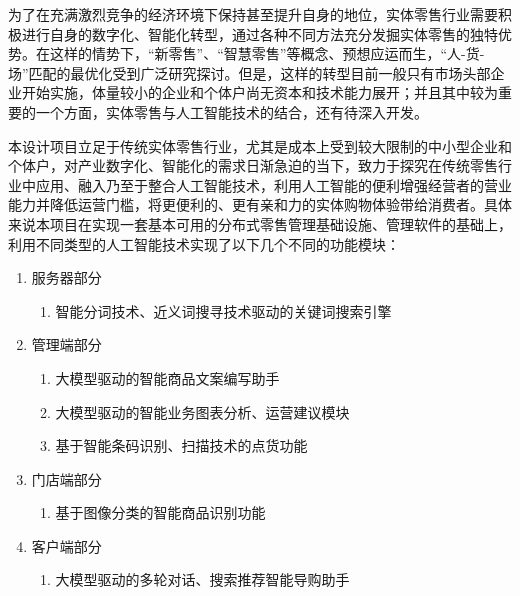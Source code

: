 为了在充满激烈竞争的经济环境下保持甚至提升自身的地位，实体零售行业需要积极进行自身的数字化、智能化转型，通过各种不同方法充分发掘实体零售的独特优势。在这样的情势下，“新零售”\cite{zhao2017new_retail,du2017new_retail}、“智慧零售”\cite{liao2019intelligent_retail}等概念、预想应运而生，“人-货-场”匹配的最优化\cite{wang2018person_good_place}受到广泛研究探讨。但是，这样的转型目前一般只有市场头部企业开始实施，体量较小的企业和个体户尚无资本和技术能力展开；并且其中较为重要的一个方面，实体零售与人工智能技术的结合，还有待深入开发。


本设计项目立足于传统实体零售行业，尤其是成本上受到较大限制的中小型企业和个体户，对产业数字化、智能化的需求日渐急迫的当下，致力于探究在传统零售行业中应用、融入乃至于整合人工智能技术，利用人工智能的便利增强经营者的营业能力并降低运营门槛，将更便利的、更有亲和力的实体购物体验带给消费者。具体来说本项目在实现一套基本可用的分布式零售管理基础设施、管理软件的基础上，利用不同类型的人工智能技术实现了以下几个不同的功能模块：

\begin{enumerate}
    \item 服务器部分
    \begin{enumerate}
        \item 智能分词技术、近义词搜寻技术驱动的关键词搜索引擎
    \end{enumerate}
    \item 管理端部分
    \begin{enumerate}
        \item 大模型驱动的智能商品文案编写助手
        \item 大模型驱动的智能业务图表分析、运营建议模块
        \item 基于智能条码识别、扫描技术的点货功能
    \end{enumerate}
    \item 门店端部分
    \begin{enumerate}
        \item 基于图像分类的智能商品识别功能
    \end{enumerate}
    \item 客户端部分
    \begin{enumerate}
        \item 大模型驱动的多轮对话、搜索推荐智能导购助手
    \end{enumerate}
\end{enumerate}

